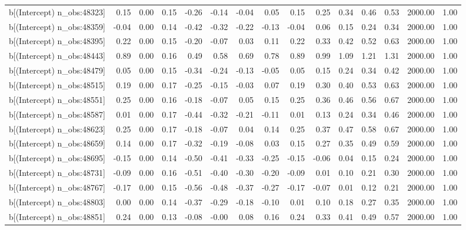 \begin{table}[ht]
\begin{tabular}{rrrrrrrrrrrrrrr}
  b[(Intercept) n\_obs:48323] & 0.15 & 0.00 & 0.15 & -0.26 & -0.14 & -0.04 & 0.05 & 0.15 & 0.25 & 0.34 & 0.46 & 0.53 & 2000.00 & 1.00 \\ 
  b[(Intercept) n\_obs:48359] & -0.04 & 0.00 & 0.14 & -0.42 & -0.32 & -0.22 & -0.13 & -0.04 & 0.06 & 0.15 & 0.24 & 0.34 & 2000.00 & 1.00 \\ 
  b[(Intercept) n\_obs:48395] & 0.22 & 0.00 & 0.15 & -0.20 & -0.07 & 0.03 & 0.11 & 0.22 & 0.33 & 0.42 & 0.52 & 0.63 & 2000.00 & 1.00 \\ 
  b[(Intercept) n\_obs:48443] & 0.89 & 0.00 & 0.16 & 0.49 & 0.58 & 0.69 & 0.78 & 0.89 & 0.99 & 1.09 & 1.21 & 1.31 & 2000.00 & 1.00 \\ 
  b[(Intercept) n\_obs:48479] & 0.05 & 0.00 & 0.15 & -0.34 & -0.24 & -0.13 & -0.05 & 0.05 & 0.15 & 0.24 & 0.34 & 0.42 & 2000.00 & 1.00 \\ 
  b[(Intercept) n\_obs:48515] & 0.19 & 0.00 & 0.17 & -0.25 & -0.15 & -0.03 & 0.07 & 0.19 & 0.30 & 0.40 & 0.53 & 0.63 & 2000.00 & 1.00 \\ 
  b[(Intercept) n\_obs:48551] & 0.25 & 0.00 & 0.16 & -0.18 & -0.07 & 0.05 & 0.15 & 0.25 & 0.36 & 0.46 & 0.56 & 0.67 & 2000.00 & 1.00 \\ 
  b[(Intercept) n\_obs:48587] & 0.01 & 0.00 & 0.17 & -0.44 & -0.32 & -0.21 & -0.11 & 0.01 & 0.13 & 0.24 & 0.34 & 0.46 & 2000.00 & 1.00 \\ 
  b[(Intercept) n\_obs:48623] & 0.25 & 0.00 & 0.17 & -0.18 & -0.07 & 0.04 & 0.14 & 0.25 & 0.37 & 0.47 & 0.58 & 0.67 & 2000.00 & 1.00 \\ 
  b[(Intercept) n\_obs:48659] & 0.14 & 0.00 & 0.17 & -0.32 & -0.19 & -0.08 & 0.03 & 0.15 & 0.27 & 0.35 & 0.49 & 0.59 & 2000.00 & 1.00 \\ 
  b[(Intercept) n\_obs:48695] & -0.15 & 0.00 & 0.14 & -0.50 & -0.41 & -0.33 & -0.25 & -0.15 & -0.06 & 0.04 & 0.15 & 0.24 & 2000.00 & 1.00 \\ 
  b[(Intercept) n\_obs:48731] & -0.09 & 0.00 & 0.16 & -0.51 & -0.40 & -0.30 & -0.20 & -0.09 & 0.01 & 0.10 & 0.21 & 0.30 & 2000.00 & 1.00 \\ 
  b[(Intercept) n\_obs:48767] & -0.17 & 0.00 & 0.15 & -0.56 & -0.48 & -0.37 & -0.27 & -0.17 & -0.07 & 0.01 & 0.12 & 0.21 & 2000.00 & 1.00 \\ 
  b[(Intercept) n\_obs:48803] & 0.00 & 0.00 & 0.14 & -0.37 & -0.29 & -0.18 & -0.10 & 0.01 & 0.10 & 0.18 & 0.27 & 0.35 & 2000.00 & 1.00 \\ 
  b[(Intercept) n\_obs:48851] & 0.24 & 0.00 & 0.13 & -0.08 & -0.00 & 0.08 & 0.16 & 0.24 & 0.33 & 0.41 & 0.49 & 0.57 & 2000.00 & 1.00 \\ 

\end{tabular}
\end{table}
